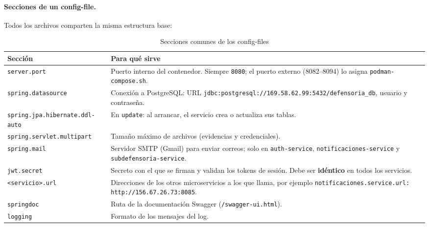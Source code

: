 \paragraph{Secciones de un config-file.} Todos los archivos comparten la misma estructura base:
\begin{table}[H]
\centering
\caption{Secciones comunes de los config-files}
\small
\begin{tabular}{p{5.3cm}p{9.1cm}}
\toprule
\textbf{Sección} & \textbf{Para qué sirve} \\
\midrule
\texttt{server.port} & Puerto interno del contenedor. Siempre \texttt{8080}; el puerto externo (8082--8094) lo asigna \texttt{podman-compose.sh}. \\
\texttt{spring.datasource} & Conexión a PostgreSQL: URL \nolinkurl{jdbc:postgresql://169.58.62.99:5432/defensoria_db}, usuario y contraseña. \\
\texttt{spring.jpa.hibernate}\linebreak\texttt{.ddl-auto} & En \texttt{update}: al arrancar, el servicio crea o actualiza sus tablas. \\
\texttt{spring.servlet.multipart} & Tamaño máximo de archivos (evidencias y credenciales). \\
\texttt{spring.mail} & Servidor SMTP (Gmail) para enviar correos; solo en \texttt{auth-service}, \texttt{notificaciones-service} y \texttt{subdefensoria-service}. \\
\texttt{jwt.secret} & Secreto con el que se firman y validan los tokens de sesión. Debe ser \textbf{idéntico} en todos los servicios. \\
\texttt{<servicio>.url} & Direcciones de los otros microservicios a los que llama, por ejemplo \texttt{notificaciones.service.url: http://156.67.26.73:8085}. \\
\texttt{springdoc} & Ruta de la documentación Swagger (\texttt{/swagger-ui.html}). \\
\texttt{logging} & Formato de los mensajes del log. \\
\bottomrule
\end{tabular}
\end{table}

